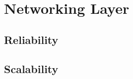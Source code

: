 \section{Networking Layer} \label{sec:networking}

\subsection{Reliability}

\subsection{Scalability}
